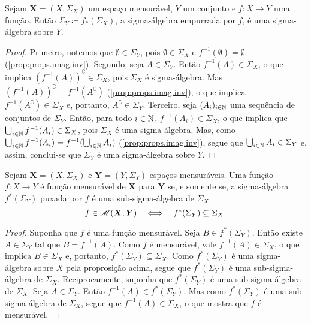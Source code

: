 \begin{prop}
Sejam $\bm X = (X,\Sigma_X)$ um espaço mensurável, $Y$ um conjunto e $f: X \to Y$ uma função. Então $\Sigma_Y \coloneqq f_*(\Sigma_X)$, a sigma-álgebra empurrada por $f$, é uma sigma-álgebra sobre $Y$.
\end{prop}
\begin{proof}
Primeiro, notemos que $\emptyset \in \Sigma_Y$, pois $\emptyset \in \Sigma_X$ e $f^{-1}(\emptyset) = \emptyset$ (\ref{prop:props.imag.inv}). Segundo, seja $A \in \Sigma_Y$. Então $f^{-1}(A) \in \Sigma_ X$, o que implica $(f^{-1}(A))^\complement \in \Sigma_ X$, pois $\Sigma_ X$ é sigma-álgebra. Mas $(f^{-1}(A))^\complement = f^{-1}(A^\complement)$ (\ref{prop:props.imag.inv}), o que implica $f^{-1}(A^\complement) \in \Sigma_ X$ e, portanto, $A^\complement \in \Sigma_ Y$. Terceiro, seja $(A_i)_{i \in \mathbb{N}}$ uma sequência de conjuntos de $\Sigma_ Y$. Então, para todo $i \in \mathbb{N}$, $f^{-1}(A_i) \in \Sigma_ X$, o que implica que $\bigcup_{i \in \mathbb{N}} f^{-1}(A_i) \in \Sigma_ X$, pois $\Sigma_ X$ é uma sigma-álgebra. Mas, como $\bigcup_{i \in \mathbb{N}} f^{-1}(A_i) = f^{-1}(\bigcup_{i \in \mathbb{N}} A_i)$ (\ref{prop:props.imag.inv}), segue que $\bigcup_{i \in \mathbb{N}} A_i \in \Sigma_ Y$ e, assim, conclui-se que $\Sigma_ Y$ é uma sigma-álgebra sobre $Y$.
\end{proof}

\begin{prop}
Sejam $\bm X = (X,\Sigma_ X)$ e $\bm Y = (Y,\Sigma_ Y)$ espaços mensuráveis. Uma função $f: X \to Y$ é função mensurável de $\bm X$ para $\bm Y$ se, e somente se, a sigma-álgebra $f^*(\Sigma_Y)$ puxada por $f$ é uma sub-sigma-álgebra de $\Sigma_ X$.
	\begin{equation*}
	f \in \mathscr{M}(\bm X,\bm Y) \quad \Longleftrightarrow \quad f^*(\Sigma_Y) \subseteq \Sigma_X.
	\end{equation*}
\end{prop}
\begin{proof}
Suponha que $f$ é uma função mensurável. Seja $B \in f^*(\Sigma_Y)$. Então existe $A \in \Sigma_ Y$ tal que $B = f^{-1}(A)$. Como $f$ é mensurável, vale $f^{-1}(A) \in \Sigma_ X$, o que implica $B \in \Sigma_ X$ e, portanto, $f^*(\Sigma_Y) \subseteq \Sigma_ X$. Como $f^*(\Sigma_Y)$ é uma sigma-álgebra sobre $X$ pela proprosição acima, segue que $f^*(\Sigma_Y)$ é uma sub-sigma-álgebra de $\Sigma_ X$. Reciprocamente, suponha que $f^*(\Sigma_Y)$ é uma sub-sigma-álgebra de $\Sigma_ X$. Seja $A \in \Sigma_ Y$. Então $f^{-1}(A) \in f^*(\Sigma_Y)$. Mas como $f^*(\Sigma_Y)$ é uma sub-sigma-álgebra de $\Sigma_ X$, segue que $f^{-1}(A) \in \Sigma_ X$, o que mostra que $f$ é mensurável.
\end{proof}


